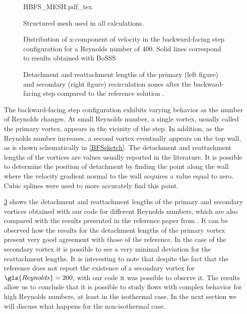 \begin{figure}[tb]
	\begin{center}
		\def\svgwidth{0.8\textwidth}
		{HBFS_MESH.pdf_tex}
		\caption{Structured mesh used in all calculations. }
		\label{bfsmesh}
	\end{center}
\end{figure}

\begin{figure}[bt]
	\centering
	\caption{Distribution of x-component of velocity in the backward-facing step configuration for a Reynolds number of 400. Solid lines correspond to results obtained with BoSSS}
	\label{fig:uvelBFS}
\end{figure}



\begin{figure}[tb]
	\centering
	\caption{ Detachment and reattachment lengths of the primary (left figure) and secondary (right figure) recirculation zones after the backward-facing step compared to the reference solution \citep{biswasBackwardFacingStepFlows2004}.}
	\label{fig:Re_De_Attachmentlengths}
\end{figure}
The backward-facing step configuration exhibits varying behavior as the number of Reynolds changes. At small Reynolds number, a single vortex, usually called the primary vortex, appears in the vicinity of the step. In addition, as the Reynolds number increases, a second vortex eventually appears on the top wall, as is shown schematically in  \cref{BFSsketch}.
The detachment and reattachment lengths of the vortices are values usually reported in the literature. It is possible to determine the position of detachment by finding the point along the wall where the velocity gradient normal to the wall acquires a value equal to zero. Cubic splines were used to more accurately find this point.

\cref{fig:Re_De_Attachmentlengths} shows the detachment and reattachment lengths of the primary and secondary vortices obtained with our code for different Reynolds numbers, which are also compared with the results presented in the reference paper from \cite{biswasBackwardFacingStepFlows2004}. It can be observed how the results for the detachment lengths of the primary vortex present very good agreement with those of the reference. In the case of the secondary vortex it is possible to see a very minimal deviation for the reattachment lengths. It is interesting to note that despite the fact that the reference does not report the existence of a secondary vortex for $\gls{Reynolds} = 200$, with our code it was possible to observe it. The results allow us to conclude that it is possible to study flows with complex behavior for high Reynolds numbers, at least in the isothermal case. In the next section we will discuss what happens for the non-isothermal case.


